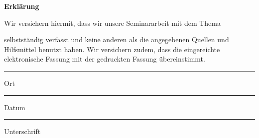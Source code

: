 \newpage
{}
\thispagestyle{empty}

\begin{center}
	\textbf{\LARGE{Erklärung}}
\end{center}
\vspace{12pt}

\begin{center}
	\textnormal{Wir versichern hiermit, dass wir unsere Seminararbeit mit dem Thema}
\end{center}
\vspace{\spacemedium}
\begin{center}
	\textbf{\arbeitstitel}
\end{center}
\vspace{\spacemedium}
\begin{center}
	\textnormal{selbstständig verfasst und keine anderen als die angegebenen Quellen und Hilfsmittel benutzt haben.
		Wir versichern zudem, dass die eingereichte elektronische Fassung mit der gedruckten Fassung übereinstimmt.}
\end{center}
\vspace{1.5cm}
\begin{multicols}{2}

	\hrule width4cm{Ort}
	\vspace{2cm}

	\hrule width4cm{Datum}
	\columnbreak

	\hrule width4cm{Unterschrift}
\end{multicols}
